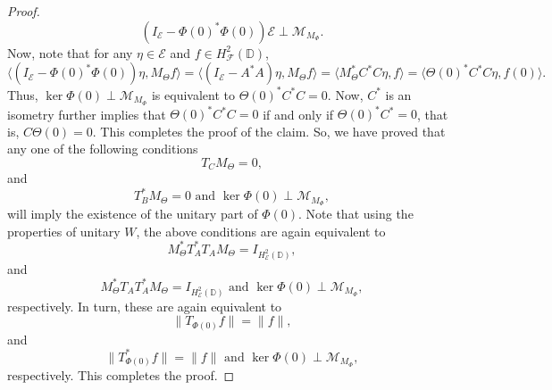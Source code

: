 \documentclass[12pt]{amsart}
\numberwithin{equation}{section}
\newtheorem{thm}[propn]{Theorem}
\theoremstyle{definition}
\newcommand{\D}{\mathbb{D}}
\newcommand{\T}{\mathbb{T}}
\newcommand{\1}{{\mbox{\bf 1}}}
\newcommand{\clb}{\mathcal{B}}
\newcommand{\cle}{\mathcal{E}}
\newcommand{\clf}{\mathcal{F}}
\newcommand{\clm}{\mathcal{M}}
\newcommand{\raro}{\rightarrow}
\begin{document}
\begin{proof}
\[
(I_{\cle}  - \Phi(0)^* \Phi(0)) \cle \perp \clm_{M_{\Phi}}.
\]
Now, note that for any $\eta \in \cle$ and $f \in H_{\clf}^2(\D)$,
\[
\langle (I_{\cle} - \Phi(0)^* \Phi(0)) \eta,  M_{\Theta} f \rangle = \langle (I_{\cle} - A^* A) \eta,  M_{\Theta} f \rangle = \langle M_{\Theta}^* C^*C  \eta,   f \rangle =  \langle  \Theta(0)^* C^* C  \eta,  f(0) \rangle.
\]
Thus, $\ker \Phi(0) \perp \clm_{M_{\Phi}}$ is equivalent to $ \Theta(0)^* C^* C = 0$. Now, $C^*$ is an isometry further implies that $ \Theta(0)^* C^* C = 0$ if and only if $ \Theta(0)^* C^* = 0$, that is, $C \Theta(0) = 0$. This completes the proof of the claim. So, we have proved that any one of the following conditions 
\[
T_{C} M_{\Theta} = 0,
\]
and 
\[
T_{B}^* M_{\Theta} = 0 \text{ and } \ker \Phi(0) \perp \clm_{M_{\Phi}},
\]
will imply the existence of the unitary part of $\Phi(0)$. Note that using the properties of unitary $W$, the above conditions are again equivalent to 
\[
 M_{\Theta}^* T_A^* T_A M_{\Theta} =  I_{H_{\cle}^2(\D)},
\]
and
\[
 M_{\Theta}^* T_A T_A^* M_{\Theta} =  I_{H_{\cle}^2(\D)} \text{ and }  \ker \Phi(0) \perp \clm_{M_{\Phi}},
\]
respectively. In turn, these are again equivalent to
\[
\|T_{\Phi(0)}f\| = \|f\|,
\]
and
\[
\|T_{\Phi(0)}^*f\| = \|f\| \text{ and }  \ker \Phi(0) \perp \clm_{M_{\Phi}},
\]
respectively. This completes the proof.
\end{proof}
%
\end{document}
